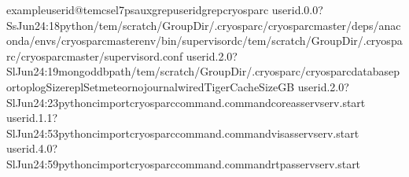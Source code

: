 \documentclass[a4paper,11pt,english]{sphinxmanual}
\begin{document}
\begin{sphinxVerbatim}[commandchars=\\\{\}]
exampleuserid@tem\PYGZhy{}cs\PYGZhy{}el7\PYGZdl{}\PYGZgt{}psauxgrep\PYGZlt{}userid\PYGZgt{}grepcryosparc
userid.0.0?SsJun24:18python/tem/scratch/\PYGZlt{}GroupDir\PYGZgt{}/.cryosparc/cryosparc\PYGZus{}master/deps/anaconda/envs/cryosparc\PYGZus{}master\PYGZus{}env/bin/supervisord\PYGZhy{}c/tem/scratch/\PYGZlt{}GroupDir\PYGZgt{}/.cryosparc/cryosparc\PYGZus{}master/supervisord.conf
userid.2.0?SlJun24:19mongod\PYGZhy{}\PYGZhy{}dbpath/tem/scratch/\PYGZlt{}GroupDir\PYGZgt{}/.cryosparc/cryosparc\PYGZus{}database\PYGZhy{}\PYGZhy{}port\PYGZhy{}\PYGZhy{}oplogSize\PYGZhy{}\PYGZhy{}replSetmeteor\PYGZhy{}\PYGZhy{}nojournal\PYGZhy{}\PYGZhy{}wiredTigerCacheSizeGB
userid.2.0?SlJun24:23python\PYGZhy{}cimportcryosparc\PYGZus{}command.command\PYGZus{}coreasservserv.start
userid.1.1?SlJun24:53python\PYGZhy{}cimportcryosparc\PYGZus{}command.command\PYGZus{}visasservserv.start
userid.4.0?SlJun24:59python\PYGZhy{}cimportcryosparc\PYGZus{}command.command\PYGZus{}rtpasservserv.start

\end{sphinxVerbatim}
\end{document}
